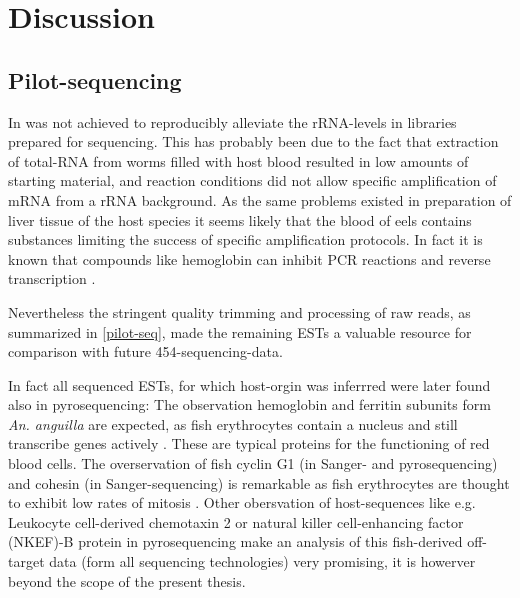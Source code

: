 
\chapter{Discussion} %



\ifpdf
    \graphicspath{{7_discussion/figures/PNG/}{7_discussion/figures/PDF/}{7_discussion/figures/}}
\else
    \graphicspath{{7_discussion/figures/EPS/}{7_discussion/figures/}}
\fi



\section{Pilot-sequencing}
\label{sec:sanger-pil}

In was not achieved to reproducibly alleviate the rRNA-levels in
libraries prepared for sequencing. This has probably been due to the
fact that extraction of total-RNA from worms filled with host blood
resulted in low amounts of starting material, and reaction conditions
did not allow specific amplification of mRNA from a rRNA
background. As the same problems existed in preparation of liver
tissue of the host species it seems likely that the blood of eels
contains substances limiting the success of specific amplification
protocols. In fact it is known that compounds like hemoglobin can
inhibit PCR reactions \cite{pmid9327537} and reverse transcription
\cite{pmid16109794}.

Nevertheless the stringent quality trimming and processing of raw
reads, as summarized in \ref{pilot-seq}, made the remaining ESTs a
valuable resource for comparison with future 454-sequencing-data.

In fact all sequenced ESTs, for which host-orgin was inferrred were
later found also in pyrosequencing: The observation hemoglobin and
ferritin subunits form \textit{An. anguilla} are expected, as fish
erythrocytes contain a nucleus and still transcribe genes actively
\cite{pmid20614118}. These are typical proteins for the functioning of
red blood cells. The overservation of fish cyclin G1 (in Sanger- and
pyrosequencing) and cohesin (in Sanger-sequencing) is remarkable as
fish erythrocytes are thought to exhibit low rates of mitosis
\cite{pmid7506383}. Other obersvation of host-sequences like
e.g. Leukocyte cell-derived chemotaxin 2 or natural killer
cell-enhancing factor (NKEF)-B protein in pyrosequencing make an
analysis of this fish-derived off-target data (form all sequencing
technologies) very promising, it is howerver beyond the scope of the
present thesis.

